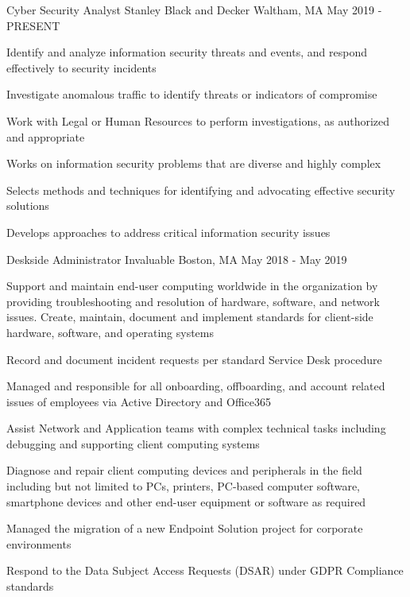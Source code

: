 
\begin{cventries}
  \cventry
    {Cyber Security Analyst} %
    {Stanley Black and Decker} %
    {Waltham, MA} %
    {May 2019 - PRESENT} %
    {
      \begin{cvitems} %
        \item {Identify and analyze information security threats and events, and respond effectively to security incidents}
        \item {Investigate anomalous traffic to identify threats or indicators of compromise}
        \item {Work with Legal or Human Resources to perform investigations, as authorized and appropriate}
        \item {Works on information security problems that are diverse and highly complex}
        \item {Selects methods and techniques for identifying and advocating effective security solutions}
        \item {Develops approaches to address critical information security issues}
      \end{cvitems}
    }

  \cventry
    {Deskside Administrator} %
    {Invaluable} %
    {Boston, MA} %
    {May 2018 - May 2019} %
    {
      \begin{cvitems} %
        \item {Support and maintain end-user computing worldwide in the organization by providing troubleshooting and
        resolution of hardware, software, and network issues. Create, maintain, document and implement standards for
        client-side hardware, software, and operating systems}
        \item {Record and document incident requests per standard Service Desk procedure}
        \item {Managed and responsible for all onboarding, offboarding, and account related issues of employees via Active
        Directory and Office365}
        \item {Assist Network and Application teams with complex technical tasks including debugging and supporting client
        computing systems}
        \item {Diagnose and repair client computing devices and peripherals in the field including but not limited to PCs,
        printers, PC-based computer software, smartphone devices and other end-user equipment or software as
        required}
        \item {Managed the migration of a new Endpoint Solution project for corporate environments}
        \item {Respond to the Data Subject Access Requests (DSAR) under GDPR Compliance standards}
      \end{cvitems}
    }


\end{cventries}
